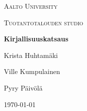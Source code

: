 \begin{titlepage}
  \centering
  {\scshape\LARGE Aalto University \par}
  \vspace{1cm}
  {\scshape\Large Tuotantotalouden studio\par}
  \vspace{1.5cm}
  {\huge\bfseries Kirjallisuuskatsaus \par}
  \vspace{2cm}
  {\Large Krista Huhtamäki \par}
  {\Large Ville Kumpulainen \par}
  {\Large Pyry Päivölä \par}
  \vfill
  {\large \today\par}

\end{titlepage}
